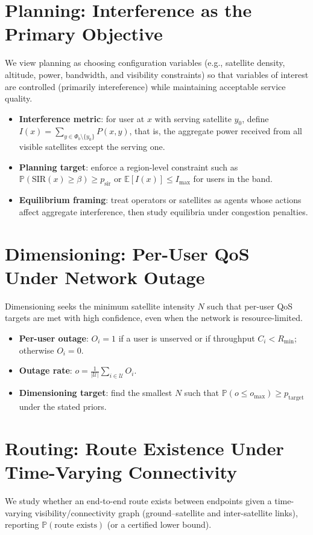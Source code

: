 \section{Planning: Interference as the Primary Objective}
We view planning as choosing configuration variables (e.g., satellite density,
altitude, power, bandwidth, and visibility constraints) so that variables of interest are
controlled (primarily intereference) while maintaining acceptable service quality.
\begin{itemize}
    \item \textbf{Interference metric}: for user at $x$ with serving satellite
    $y_0$, define $I(x)=\sum_{y\in \Phi_b\setminus\{y_0\}} P(x,y)$, that is, the aggregate power
    received from all visible satellites except the serving one.
    \item \textbf{Planning target}: enforce a region-level constraint such as
    $\mathbb{P}(\mathrm{SIR}(x)\ge\beta)\ge p_{\mathrm{sir}}$ or
    $\mathbb{E}[I(x)]\le I_{\max}$ for users in the band.
    \item \textbf{Equilibrium framing}: treat operators or satellites as agents
    whose actions affect aggregate interference, then study equilibria under
    congestion penalties.
\end{itemize}

\section{Dimensioning: Per-User QoS Under Network Outage}
Dimensioning seeks the minimum satellite intensity $N$ such that per-user QoS
targets are met with high confidence, even when the network is resource-limited.
\begin{itemize}
    \item \textbf{Per-user outage}: $O_i=1$ if a user is unserved or if
    throughput $C_i < R_{\min}$; otherwise $O_i=0$.
    \item \textbf{Outage rate}: $o = \frac{1}{|\mathcal{U}|}\sum_{i\in\mathcal{U}} O_i$.
    \item \textbf{Dimensioning target}: find the smallest $N$ such that
    $\mathbb{P}(o \le o_{\max}) \ge p_{\mathrm{target}}$ under the stated priors.
\end{itemize}

\section{Routing: Route Existence Under Time-Varying Connectivity}
We study whether an end-to-end route exists between endpoints given a time-varying visibility/connectivity graph
(ground--satellite and inter-satellite links), reporting $\mathbb{P}(\text{route exists})$ (or a certified lower bound).


